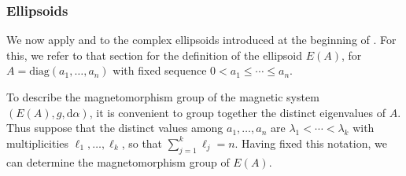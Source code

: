 \documentclass[11pt,reqno]{amsart}
\newcommand{\IR}{{\mathbb R}}%
\theoremstyle{plain}
\newtheorem{cor}[thm]{Corollary}
\theoremstyle{definition}
\numberwithin{equation}{section}
\def\d{\delta}
\def\d{\delta}
\def\d{{\mathrm{d}}}
\newcommand{\set}[2]{\left\{ \, #1  \, | \,  #2 \, \right\}}
\newcommand{\Unitary}[0]{\mathrm{U}}
\begin{document}

\subsubsection{Ellipsoids}
\label{subsubsection: ellipsoids}

We now apply  and  to the complex ellipsoids introduced at the beginning of . For this, we refer to that section for the definition of the ellipsoid $E(A)$, for $A=\mathrm{diag}(a_1,\ldots,a_n)$ with fixed sequence $0<a_1\leq \cdots \leq a_n$.

To describe the magnetomorphism group of the magnetic system $(E(A), g,\d\alpha)$, it is convenient to group together the distinct eigenvalues of $A$. Thus suppose that the distinct values among $a_1,\ldots,a_n$ are $\lambda_1<\cdots<\lambda_k$ with multiplicities $\ell_1,\ldots,\ell_k$, so that $\sum_{j=1}^k \ell_j=n$. 
Having fixed this notation, we can determine the magnetomorphism group of $E(A)$.
\end{document}
